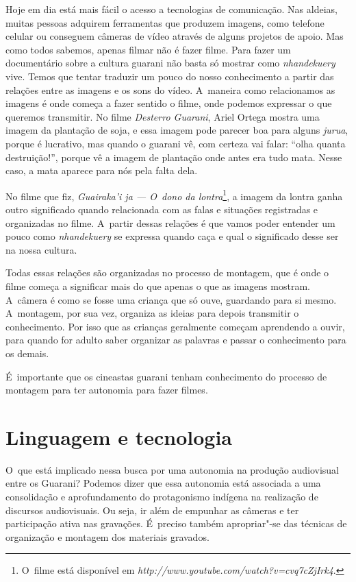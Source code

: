 Hoje em dia está mais fácil o acesso a tecnologias de comunicação. Nas
aldeias, muitas pessoas adquirem ferramentas que produzem imagens, como
telefone celular ou conseguem câmeras de vídeo através de alguns
projetos de apoio. Mas como todos sabemos, apenas filmar não é fazer
filme. Para fazer um documentário sobre a cultura guarani não basta só
mostrar como \emph{nhandekuery} vive. Temos que tentar traduzir um pouco do
nosso conhecimento a partir das relações entre as imagens e os sons do
vídeo. A~maneira como relacionamos as imagens é onde começa a fazer
sentido o filme, onde podemos expressar o que queremos transmitir. No
filme \emph{Desterro Guarani}, Ariel Ortega mostra uma imagem da plantação de
soja, e essa imagem pode parecer boa para alguns \emph{jurua}, porque é
lucrativo, mas quando o guarani vê, com certeza vai falar: ``olha quanta
destruição!'', porque vê a imagem de plantação onde antes era tudo mata.
Nesse caso, a mata aparece para nós pela falta dela. 

No filme que fiz, \emph{Guairaka’i ja --- O~dono da lontra}\footnote{O~filme está
disponível em \emph{http://www.youtube.com/watch?v=cvq7cZjIrk4}.},
a imagem da lontra ganha outro significado quando relacionada com as
falas e situações registradas e organizadas no filme. A~partir dessas
relações é que vamos poder entender um pouco como \emph{nhandekuery} se
expressa quando caça e qual o significado desse ser na nossa cultura. 

Todas essas relações são organizadas no processo de montagem, que é onde
o filme começa a significar mais do que apenas o que as imagens
mostram. A~câmera é como se fosse uma criança que só ouve, guardando
para si mesmo. A~montagem, por sua vez, organiza as ideias para depois
transmitir o conhecimento. Por isso que as crianças geralmente começam
aprendendo a ouvir, para quando for adulto saber organizar as palavras
e passar o conhecimento para os demais.

É~importante que os cineastas guarani tenham conhecimento do processo de
montagem para ter autonomia para fazer filmes. 

\section{Linguagem e tecnologia}

O~que está implicado nessa busca por uma autonomia na produção
audiovisual entre os Guarani? Podemos dizer que essa autonomia está
associada a uma consolidação e aprofundamento do protagonismo indígena
na realização de discursos audiovisuais. Ou seja, ir além de empunhar
as câmeras e ter participação ativa nas gravações. É~preciso também
apropriar"-se das técnicas de organização e montagem dos materiais
gravados.

